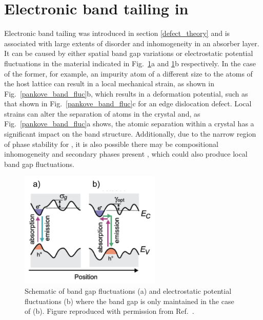 \documentclass[11pt, twoside]{report}
\begin{document}
\section{Electronic band tailing in {\CZTS}}\label{eris_band_tailing}
Electronic band tailing was introduced in section \ref{defect_theory} and is associated with large extents of disorder and inhomogeneity in an absorber layer. It can be caused by either spatial band gap variations or electrostatic potential fluctuations in the material \cite{band_tail} indicated in Fig.~\ref{gokmen_band_tailing}a and \ref{gokmen_band_tailing}b respectively. In the case of the former, for example, an impurity atom of a different size to the atoms of the host lattice can result in a local mechanical strain, as shown in Fig.~\ref{pankove_band_fluc}b, which results in a deformation potential, such as that shown in Fig.~\ref{pankove_band_fluc}c for an edge dislocation defect. Local strains can alter the separation of atoms in the crystal and, as Fig.~\ref{pankove_band_fluc}a shows, the atomic separation within a crystal has a significant impact on the band structure. Additionally, due to the narrow region of phase stability for {\CZTS}, it is also possible there may be compositional inhomogeneity and secondary phases present \cite{SandS}, which could also produce local band gap fluctuations.

\begin{figure}[h!]
\centering
\includegraphics[width=0.6\textwidth]{figures/gokmen_band_tailing.png}
\caption[Schematic of band gap fluctuations (a) and electrostatic potential fluctuations (b) where the band gap is only maintained in the case of (b).]{Schematic of band gap fluctuations (a) and electrostatic potential fluctuations (b) where the band gap is only maintained in the case of (b). Figure reproduced with permission from Ref.~.}\label{gokmen_band_tailing}
\end{figure}
\end{document}
